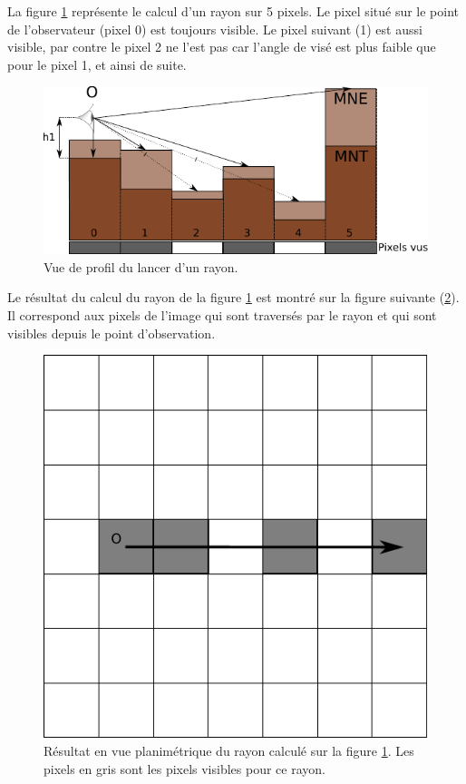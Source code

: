\documentclass{report}
\begin{document}
La figure \ref{ray_side} représente le calcul d'un rayon sur 5 pixels. Le pixel situé sur le point de l'observateur (pixel 0) est toujours visible. Le pixel suivant (1) est aussi visible, par contre le pixel 2 ne l'est pas car l'angle de visé est plus faible que pour le pixel 1, et ainsi de suite.

\begin{figure}[H]
	\includegraphics{img/ray_side-fr.pdf} 
	\caption{Vue de profil du lancer d'un rayon.}
	\label{ray_side}
\end{figure}

Le résultat du calcul du rayon de la figure \ref{ray_side} est montré sur la figure suivante (\ref{grid_result}). Il correspond aux pixels de l'image qui sont traversés par le rayon et qui sont visibles depuis le point d'observation.

\begin{figure}[H]
	\includegraphics[scale=0.8]{img/grid_result.pdf} 
	\caption{Résultat en vue planimétrique du rayon calculé sur la figure \ref{ray_side}. Les pixels en gris sont les pixels visibles pour ce rayon.}
	\label{grid_result}
\end{figure}
\end{document}

